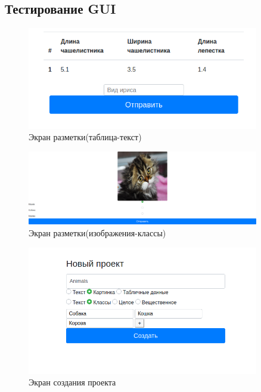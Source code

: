 \subsection{Тестирование GUI}

\begin{figure}[h!]
    \includegraphics[width=0.9\textwidth]{./tablelabel.png}
    \caption{Экран разметки(таблица-текст)}
\end{figure}

\begin{figure}[h!]
    \includegraphics[width=0.9\textwidth]{./animalslabel.png}
    \caption{Экран разметки(изображения-классы)}
\end{figure}

\begin{figure}[h!]
    \includegraphics[width=0.9\textwidth]{./create_project.png}
    \caption{Экран создания проекта}
\end{figure}
